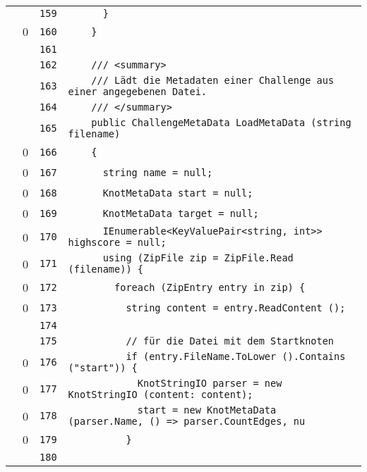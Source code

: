 \documentclass[a4paper,10pt]{article}
\begin{document}
\begin{longtable}[l]{lrrl}
\cellcolor{gray} &  & \verb~159~ & \verb~      }~\\
\cellcolor{red} & 0 & \verb~160~ & \verb~    }~\\
\cellcolor{gray} &  & \verb~161~ & \verb~~\\
\cellcolor{gray} &  & \verb~162~ & \verb~    /// <summary>~\\
\cellcolor{gray} &  & \verb~163~ & \verb~    /// Lädt die Metadaten einer Challenge aus einer angegebenen Datei.~\\
\cellcolor{gray} &  & \verb~164~ & \verb~    /// </summary>~\\
\cellcolor{gray} &  & \verb~165~ & \verb~    public ChallengeMetaData LoadMetaData (string filename)~\\
\cellcolor{red} & 0 & \verb~166~ & \verb~    {~\\
\cellcolor{red} & 0 & \verb~167~ & \verb~      string name = null;~\\
\cellcolor{red} & 0 & \verb~168~ & \verb~      KnotMetaData start = null;~\\
\cellcolor{red} & 0 & \verb~169~ & \verb~      KnotMetaData target = null;~\\
\cellcolor{red} & 0 & \verb~170~ & \verb~      IEnumerable<KeyValuePair<string, int>> highscore = null;~\\
\cellcolor{red} & 0 & \verb~171~ & \verb~      using (ZipFile zip = ZipFile.Read (filename)) {~\\
\cellcolor{red} & 0 & \verb~172~ & \verb~        foreach (ZipEntry entry in zip) {~\\
\cellcolor{red} & 0 & \verb~173~ & \verb~          string content = entry.ReadContent ();~\\
\cellcolor{gray} &  & \verb~174~ & \verb~~\\
\cellcolor{gray} &  & \verb~175~ & \verb~          // für die Datei mit dem Startknoten~\\
\cellcolor{red} & 0 & \verb~176~ & \verb~          if (entry.FileName.ToLower ().Contains ("start")) {~\\
\cellcolor{red} & 0 & \verb~177~ & \verb~            KnotStringIO parser = new KnotStringIO (content: content);~\\
\cellcolor{red} & 0 & \verb~178~ & \verb~            start = new KnotMetaData (parser.Name, () => parser.CountEdges, nu~\\
\cellcolor{red} & 0 & \verb~179~ & \verb~          }~\\
\cellcolor{gray} &  & \verb~180~ & \verb~~\\

\end{longtable}
\end{document}
